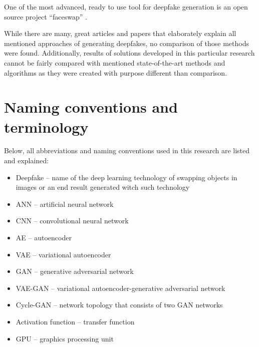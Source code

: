 One of the most advanced, ready to use tool for deepfake generation is an open source project ``faceswap'' \cite{faceswap_repo_bib}.

While there are many, great articles and papers that elaborately explain all mentioned approaches of generating deepfakes, no comparison of those methods were found. Additionally, results of solutions developed in this particular research cannot be fairly compared with mentioned state-of-the-art methods and algorithms as they were created with purpose different than comparison.

\section{Naming conventions and terminology}
Below, all abbreviations and naming conventions used in this research are listed and explained:

\begin{itemize}
\item Deepfake -- name of the deep learning technology of swapping objects in images or an end result generated witch such technology
\item ANN -- artificial neural network
\item CNN -- convolutional neural network
\item AE -- autoencoder 
\item VAE -- variational autoencoder
\item GAN -- generative adversarial network
\item VAE-GAN -- variational autoencoder-generative adversarial network
\item Cycle-GAN -- network topology that consists of two GAN networks
\item Activation function -- transfer function
\item GPU -- graphics processing unit
\end{itemize}